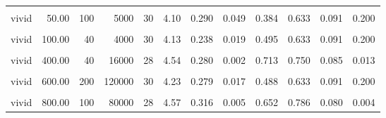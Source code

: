 \documentclass[
]{article}
\begin{document}
\begin{longtable}[t]{lrrrrrrlrrrl}
\hspace{1em}\cellcolor{gray!10}{vivid} & \cellcolor{gray!10}{50.00} & \cellcolor{gray!10}{10} & \cellcolor{gray!10}{500} & \cellcolor{gray!10}{28} & \cellcolor{gray!10}{3.86} & \cellcolor{gray!10}{0.271} & \cellcolor{gray!10}{0.094} & \cellcolor{gray!10}{0.254} & \cellcolor{gray!10}{0.750} & \cellcolor{gray!10}{0.085} & \cellcolor{gray!10}{0.013}\\
\hspace{1em}vivid & 50.00 & 100 & 5000 & 30 & 4.10 & 0.290 & 0.049 & 0.384 & 0.633 & 0.091 & 0.200\\
\hspace{1em}\cellcolor{gray!10}{vivid} & \cellcolor{gray!10}{100.00} & \cellcolor{gray!10}{30} & \cellcolor{gray!10}{3000} & \cellcolor{gray!10}{28} & \cellcolor{gray!10}{3.82} & \cellcolor{gray!10}{0.235} & \cellcolor{gray!10}{0.090} & \cellcolor{gray!10}{0.264} & \cellcolor{gray!10}{0.714} & \cellcolor{gray!10}{0.089} & \cellcolor{gray!10}{0.036}\\
\hspace{1em}vivid & 100.00 & 40 & 4000 & 30 & 4.13 & 0.238 & 0.019 & 0.495 & 0.633 & 0.091 & 0.200\\
\hspace{1em}\cellcolor{gray!10}{vivid} & \cellcolor{gray!10}{400.00} & \cellcolor{gray!10}{10} & \cellcolor{gray!10}{4000} & \cellcolor{gray!10}{30} & \cellcolor{gray!10}{4.70} & \cellcolor{gray!10}{0.230} & \cellcolor{gray!10}{<0.001} & \cellcolor{gray!10}{0.971} & \cellcolor{gray!10}{0.833} & \cellcolor{gray!10}{0.070} & \cellcolor{gray!10}{<0.001}\\
\hspace{1em}vivid & 400.00 & 40 & 16000 & 28 & 4.54 & 0.280 & 0.002 & 0.713 & 0.750 & 0.085 & 0.013\\
\hspace{1em}\cellcolor{gray!10}{vivid} & \cellcolor{gray!10}{600.00} & \cellcolor{gray!10}{20} & \cellcolor{gray!10}{12000} & \cellcolor{gray!10}{28} & \cellcolor{gray!10}{4.54} & \cellcolor{gray!10}{0.284} & \cellcolor{gray!10}{0.003} & \cellcolor{gray!10}{0.701} & \cellcolor{gray!10}{0.786} & \cellcolor{gray!10}{0.080} & \cellcolor{gray!10}{0.004}\\
\hspace{1em}vivid & 600.00 & 200 & 120000 & 30 & 4.23 & 0.279 & 0.017 & 0.488 & 0.633 & 0.091 & 0.200\\
\hspace{1em}\cellcolor{gray!10}{vivid} & \cellcolor{gray!10}{800.00} & \cellcolor{gray!10}{30} & \cellcolor{gray!10}{24000} & \cellcolor{gray!10}{30} & \cellcolor{gray!10}{4.73} & \cellcolor{gray!10}{0.207} & \cellcolor{gray!10}{<0.001} & \cellcolor{gray!10}{1.109} & \cellcolor{gray!10}{0.900} & \cellcolor{gray!10}{0.057} & \cellcolor{gray!10}{<0.001}\\
\hspace{1em}vivid & 800.00 & 100 & 80000 & 28 & 4.57 & 0.316 & 0.005 & 0.652 & 0.786 & 0.080 & 0.004\\
\bottomrule
\end{longtable}
\endgroup{}
\end{document}
